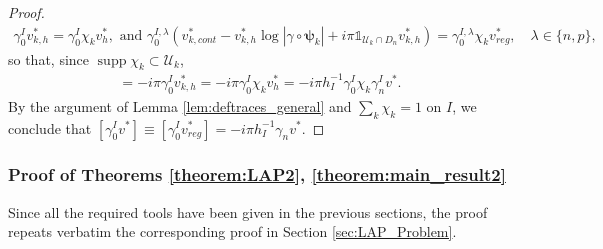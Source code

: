 \documentclass[report]{elsarticle}
\numberwithin{theorem}{section}
\newcommand{\bpsi}{\boldsymbol{\psi}}
\begin{document}
\begin{proof}
\begin{align*}
	\gamma_0^{I}v_{k,h}^*=\gamma_0^I\chi_k v_h^*, \text{ and }\gamma_0^{I
	,\lambda}(v_{k,cont}^*-{v}^*_{k,h}\log|\gamma\circ\bpsi_k|+i\pi \mathbb{1}_{\mathcal{U}_{k}\cap D_n} v^*_{k,h})=\gamma_0^{I,\lambda}\chi_k v_{reg}^*,\quad \lambda\in\{n,p\},
\end{align*}
so that, since $\operatorname{supp}\chi_k\subset\mathcal{U}_k$, 
\begin{align*}
	[\gamma_0^I \chi_k v_{reg}^*]=-i\pi \gamma_0^{I}v^*_{k,h}=-i\pi\gamma_0^I\chi_k v_h^*=-i\pi h_{I}^{-1}\gamma_0^I \chi_k \gamma_n^I v^*.
\end{align*}
By the argument of Lemma \ref{lem:deftraces_general} and $\sum\limits_k\chi_k=1$ on $I$, we conclude that $[\gamma_0^I v^*]\equiv [\gamma_0^I v_{reg}^*]=-i\pi h_I^{-1}\gamma_n v^*$.  
\end{proof}
\subsubsection{Proof of Theorems \ref{theorem:LAP2}, \ref{theorem:main_result2}}
Since all the required tools have been given in the previous sections, the proof repeats verbatim the corresponding proof in Section \ref{sec:LAP_Problem}.




















	
	 
	
\end{document}

